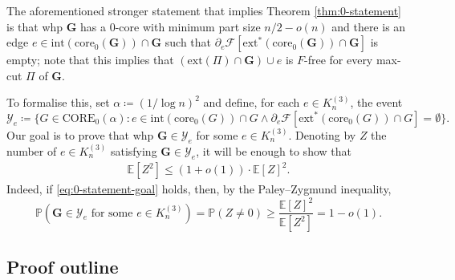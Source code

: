 \documentclass[11pt,a4paper,oneside,reqno]{amsart}
\newcommand{\bG}{\mathbf{G}}
\newcommand{\cF}{\mathcal{F}}
\newcommand{\cY}{\mathcal{Y}}
\renewcommand{\Pr}{\mathbb{P}}
\newcommand{\Ex}{\mathbb{E}}
\newcommand{\1}{\mathbbm{1}} %
\renewcommand{\le}{\leqslant}
\renewcommand{\ge}{\geqslant}
\newcommand{\ext}{\mathrm{ext}}
\renewcommand{\int}{\mathrm{int}}
\newcommand{\core}{\mathrm{core}}
\newcommand{\Core}{\mathrm{CORE}}
\begin{document}
The aforementioned stronger statement that implies Theorem \ref{thm:0-statement} is that whp $\bG$ has a $0$-core with minimum part size $n/2-o(n)$ and there is an edge $e \in \int(\core_0(\bG)) \cap \bG$ such that $\partial_e\cF[\ext^*(\core_0(\bG)) \cap \bG]$ is empty;  note that this implies that $(\ext(\Pi) \cap \bG) \cup e$ is $F$-free for every max-cut $\Pi$ of $\bG$.

To formalise this, set $\alpha \coloneqq (1/\log n)^2$ and define, for each $e \in K_n^{(3)}$, the event
\[
  \cY_e \coloneqq \big\{G \in \Core_0(\alpha) : e \in \int(\core_0(G)) \cap G \wedge \partial_e\cF[\ext^*(\core_0(G)) \cap G] = \emptyset\big\}.
\]
Our goal is to prove that whp $\bG \in \cY_e$ for some $e \in K_n^{(3)}$.
Denoting by $Z$ the number of $e \in K_n^{(3)}$ satisfying $\bG \in \cY_e$, it will be enough to show that
\begin{align}\label{eq:0-statement-goal}
  \Ex[Z^2] \le (1+o(1)) \cdot \Ex[Z]^2.
\end{align}
Indeed, if \eqref{eq:0-statement-goal} holds, then, by the Paley--Zygmund inequality,
\[
  \Pr(\text{$\bG \in \cY_e$ for some $e \in K_n^{(3)}$}) = \Pr(Z \neq 0) \ge \frac{\Ex[Z]^2}{\Ex[Z^2]} = 1-o(1).
\]

\subsection*{Proof outline}
\end{document}
